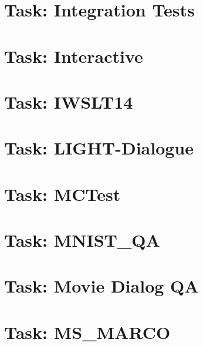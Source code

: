 \documentclass[twoside]{book}
\newcommand{\+}{\discretionary{\mbox{\scriptsize$\hookleftarrow$}}{}{}}
\begin{document}
\chapter{Task\+: Integration Tests}
\label{md_parlai_tasks_integration_tests_README}

\chapter{Task\+: Interactive}
\label{md_parlai_tasks_interactive_README}

\chapter{Task\+: I\+W\+S\+L\+T14}
\label{md_parlai_tasks_iwslt14_README}

\chapter{Task\+: L\+I\+G\+H\+T-\/\+Dialogue}
\label{md_parlai_tasks_light_dialog_README}

\chapter{Task\+: M\+C\+Test}
\label{md_parlai_tasks_mctest_README}

\chapter{Task\+: M\+N\+I\+S\+T\+\_\+\+QA}
\label{md_parlai_tasks_mnist_qa_README}

\chapter{Task\+: Movie Dialog QA}
\label{md_parlai_tasks_moviedialog_README}

\chapter{Task\+: M\+S\+\_\+\+M\+A\+R\+CO}
\label{md_parlai_tasks_ms_marco_README}

\end{document}
